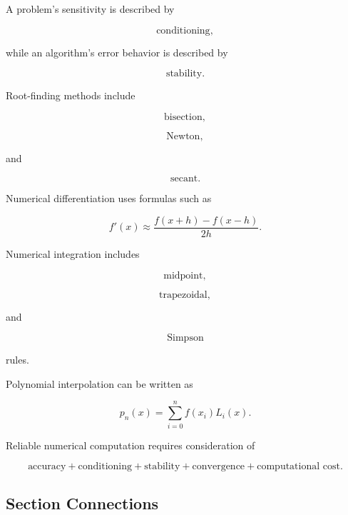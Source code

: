 A problem's sensitivity is described by

\[
\boxed{
\text{conditioning},
}
\]

while an algorithm's error behavior is described by

\[
\boxed{
\text{stability}.
}
\]

Root-finding methods include

\[
\boxed{
\text{bisection},
}
\]

\[
\boxed{
\text{Newton},
}
\]

and

\[
\boxed{
\text{secant}.
}
\]

Numerical differentiation uses formulas such as

\[
\boxed{
f'(x)
\approx
\frac{
f(x+h)-f(x-h)
}{
2h
}.
}
\]

Numerical integration includes

\[
\boxed{
\text{midpoint},
}
\]

\[
\boxed{
\text{trapezoidal},
}
\]

and

\[
\boxed{
\text{Simpson}
}
\]

rules.

Polynomial interpolation can be written as

\[
\boxed{
p_n(x)
=
\sum_{i=0}^{n}
f(x_i)L_i(x).
}
\]

Reliable numerical computation requires consideration of

\[
\boxed{
\text{accuracy}
+
\text{conditioning}
+
\text{stability}
+
\text{convergence}
+
\text{computational cost}.
}
\]

\subsection{Section Connections}
\label{subsec:numerical-analysis-connections}


